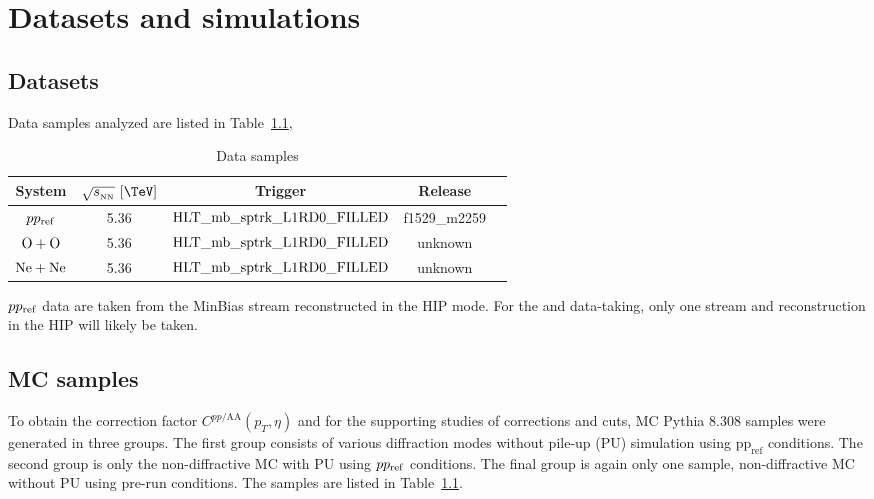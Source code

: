\chapter{Datasets and simulations}
\label{chap:dataset}
\section{Datasets}
Data samples analyzed are listed in Table~\ref{tab:comb}, 
\begin{table}[!h]
\begin{center}
\renewcommand{\arraystretch}{1.5} %
\setlength{\tabcolsep}{2.5pt} %
\begin{tabular}{ccccc}
System & $\sqn\ [\TeV]$ & Trigger & Release \\ \hline
$pp_{\mathrm{ref}}$  & 5.36 & $\text{HLT\_mb\_sptrk\_L1RD0\_FILLED}$ & f1529\_m2259  \\
$\OO$  & 5.36 & $\text{HLT\_mb\_sptrk\_L1RD0\_FILLED}$ & unknown  \\
$\NeNe$  & 5.36 & $\text{HLT\_mb\_sptrk\_L1RD0\_FILLED}$ & unknown  \\
\end{tabular}
\end{center}
\caption{Data samples}
\label{tab:comb}
\end{table}
$pp_{\mathrm{ref}}$ data are taken from the MinBias stream reconstructed in the HIP mode. For the \OO and \NeNe data-taking, only one stream and reconstruction in the HIP will likely be taken.  \black{}



\section{MC samples}
To obtain the correction factor $C^{pp/\text{AA}}(p_T, \eta)$ and for the supporting studies of corrections and cuts, MC Pythia 8.308 samples were generated in three groups. The first group consists of various diffraction modes without pile-up (PU) simulation using $\mathrm{pp_{ref}}$ conditions. The second group is only the non-diffractive MC with PU using $pp_{\mathrm{ref}}$ conditions. The final group is again only one sample, non-diffractive MC without PU using pre-\OO run conditions. The samples are listed in Table~\ref{tab:comb}.

